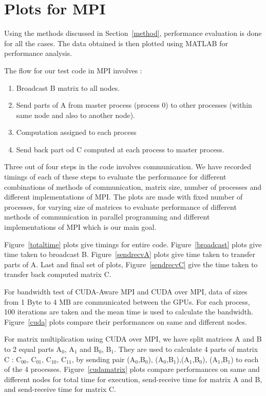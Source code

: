 \documentclass[10pt]{article}
\begin{document}
\section{Plots for MPI}
Using the methods discussed in Section~\ref{method}, performance evaluation is done for all the cases. The data obtained is then plotted using MATLAB for performance analysis.

The flow for our test code in MPI involves : 
\begin{enumerate}
\item Broadcast B matrix to all nodes.
\item Send parts of A from master process (process 0) to other processes (within same node and also to another node).
\item Computation assigned to each process
\item Send back part od C computed at each process to master process.
\end{enumerate}
Three out of four steps in the code involves communication. We have recorded timings of each of these steps to evaluate the performance for different combinations of methods of communication, matrix size, number of processes and different implementations of MPI.
The plots are made with fixed number of processes, for varying size of matrices to evaluate performance of different methods of communication in parallel programming and different implementations of MPI which is our main goal.

Figure~\ref{totaltime} plots give timings for entire code. Figure~\ref{broadcast} plots give time taken to broadcast B. Figure~\ref{sendrecvA} plots give time taken to transfer parts of A. Last and final set of plots, Figure~\ref{sendrecvC} give the time taken to transfer back computed matrix C.

For bandwidth test of CUDA-Aware MPI and CUDA over MPI, data of sizes from 1 Byte to 4 MB are communicated between the GPUs. For each process, 100 iterations are taken and the mean time is used to calculate the bandwidth. Figure~\ref{cuda} plots compare their performances on same and different nodes.

For matrix  multiplication using CUDA over MPI, we have split matrices A and B to 2 equal parts A$_{0}$, A$_{1}$ and B$_{0}$, B$_{1}$. They are used to calculate 4 parts of matrix C : C$_{00}$, C$_{01}$, C$_{10}$, C$_{11}$, by sending  pair (A$_0$,B$_0$), (A$_0$,B$_1$),(A$_1$,B$_0$), (A$_1$,B$_1$) to each of the 4 processes. Figure~\ref{cudamatrix} plots compare performances on same and different nodes for total time for execution, send-receive time for matrix A and B, and send-receive time for matrix C.
\end{document}
